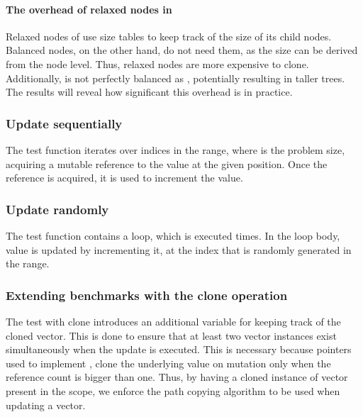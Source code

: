 \paragraph{The overhead of relaxed nodes in \rrbtree{}}
Relaxed nodes of \rrbtree{} use size tables to keep track of the size of its child nodes. Balanced nodes, on the other hand, do not need them, as the size can be derived from the node level. Thus, relaxed nodes are more expensive to clone. Additionally, \rrbtree{} is not perfectly balanced as \rbtree{}, potentially resulting in taller trees. The results will reveal how significant this overhead is in practice.

\subsubsection*{Update sequentially}
The test function iterates over indices in the \range{[0, N)} range, where \n{} is the problem size, acquiring a mutable reference to the value at the given position. Once the reference is acquired, it is used to increment the value.

\subsubsection*{Update randomly}
The test function contains a loop, which is executed \n{} times. In the loop body, value is updated by incrementing it, at the index that is randomly generated in the \range{[0, N)} range.

\subsubsection*{Extending benchmarks with the clone operation}
The test with clone introduces an additional variable for keeping track of the cloned vector. This is done to ensure that at least two vector instances exist simultaneously when the update is executed. This is necessary because \rc{} pointers used to implement \rbtree{}, clone the underlying value on mutation only when the reference count is bigger than one. Thus, by having a cloned instance of vector present in the scope, we enforce the path copying algorithm to be used when updating a vector.

